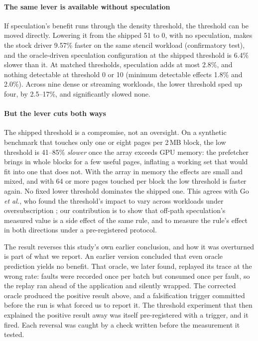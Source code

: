 \paragraph{The same lever is available without speculation}
If speculation's benefit runs through the density threshold, the threshold can
be moved directly. Lowering it from the shipped 51 to 0, with no speculation,
makes the stock driver 9.57\% faster on the same stencil workload (confirmatory
test), and the oracle-driven speculation configuration at the shipped threshold
is 6.4\% slower than it. At matched thresholds, speculation adds at most 2.8\%,
and nothing detectable at threshold 0 or 10 (minimum detectable effects 1.8\%
and 2.0\%). Across nine dense or streaming workloads, the lower threshold sped up
four, by 2.5--17\%, and significantly slowed none.

\paragraph{But the lever cuts both ways}
The shipped threshold is a compromise, not an oversight. On a synthetic
benchmark that touches only one or eight pages per 2\,MB block, the low
threshold is 41--85\% \emph{slower} once the array exceeds GPU memory: the
prefetcher brings in whole blocks for a few useful pages, inflating a working
set that would fit into one that does not. With the array in memory the
effects are small and mixed, and with 64 or more pages touched per block the low
threshold is faster again. No fixed lower threshold dominates the shipped one.
This agrees with Go \emph{et al.}, who found the threshold's impact to vary
across workloads under oversubscription \cite{go2023earlyadaptor}; our
contribution is to show that off-path speculation's measured value is a
side effect of the same rule, and to measure the rule's effect in both
directions under a pre-registered protocol.

\medskip
The result reverses this study's own earlier conclusion, and how it was
overturned is part of what we report. An earlier version concluded that even
oracle prediction yields no benefit. That oracle, we later found, replayed its
trace at the wrong rate: faults were recorded once per batch but consumed once
per fault, so the replay ran ahead of the application and silently wrapped. The
corrected oracle produced the positive result above, and a falsification
trigger committed before the run is what forced us to report it. The
threshold experiment that then explained the positive result away was itself
pre-registered with a trigger, and it fired. Each reversal was caught by a check
written before the measurement it tested.

